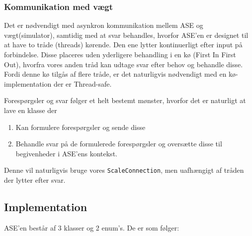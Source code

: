 \documentclass[a4paper]{article}
\begin{document}
\subsubsection{Kommunikation med vægt} %

Det er nødvendigt med asynkron kommunikation mellem ASE og vægt(simulator), samtidig med at svar behandles, hvorfor ASE'en er designet til at have to tråde (threads) kørende. Den ene lytter kontinuerligt efter input på forbindelse. Disse placeres uden yderligere behandling i en kø (First In First Out), hvorfra vores anden tråd kan udtage svar efter behov og behandle disse. Fordi denne kø tilgås af flere tråde, er det naturligvis nødvendigt med en kø-implementation der er Thread-safe.

Forespørgsler og svar følger et helt bestemt mønster, hvorfor det er naturligt at lave en klasse der
\begin{enumerate}
  \item Kan formulere forespørgsler og sende disse
  \item Behandle svar på de formulerede forespørgsler og oversætte disse til begivenheder i ASE'ens kontekst.
\end{enumerate}
Denne vil naturligvis bruge vores \texttt{ScaleConnection}, men uafhængigt af tråden der lytter efter svar.



\subsection{Implementation} %

ASE'en består af 3 klasser og 2 enum's. De er som følger:
\end{document}
